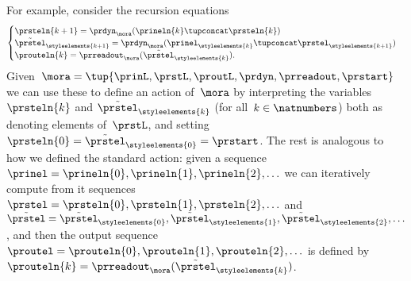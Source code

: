 For example, consider the recursion equations
\begin{equation}
    \label{eq:moore-new-recursion-equations}
    \begin{cases}
        \prsteln{k+1} = \prdyn_\mora(\prineln{k} \tupconcat \prsteln{k})                                                           \\
        \tilde{\prstel}_{\styleelements{k+1}} = \prdyn_\mora(\prinel_{\styleelements{k}} \tupconcat \prstel_{\styleelements{k+1}}) \\
        \prouteln{k}   = \prreadout_\mora(\tilde{\prstel}_{\styleelements{k}}).
    \end{cases}
\end{equation}
Given~$\mora = \tup{\prinL,\prstL,\proutL,\prdyn,\prreadout,\prstart}$ we can use these to define an action of~$\mora$ by interpreting the variables~$\prsteln{k}$ and $\tilde{\prstel}_\styleelements{k}$ (for all~$k \in \natnumbers$) both as denoting elements of~$\prstL$, and setting~$\prsteln{0} = \tilde{\prstel}_\styleelements{0} = \prstart$.
The rest is analogous to how we defined the standard action:
given a sequence~$\prinel = \prineln{0}, \prineln{1}, \prineln{2}, \ldots$ we can iteratively compute from it sequences~$\prstel = \prsteln{0}, \prsteln{1}, \prsteln{2}, \ldots$ and~$\tilde \prstel = \tilde{\prstel}_\styleelements{0}, \tilde{\prstel}_\styleelements{1}, \tilde{\prstel}_\styleelements{2}, \ldots$, and then the output sequence~$\proutel = \prouteln{0}, \prouteln{1}, \prouteln{2}, \ldots$ is defined by~$\prouteln{k}   = \prreadout_\mora(\tilde{\prstel}_{\styleelements{k}})$.

